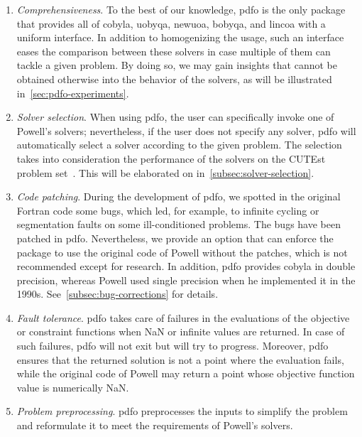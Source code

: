 \begin{enumerate}
    \item \emph{Comprehensiveness}.
    To the best of our knowledge, \gls{pdfo} is the only package that provides all of \gls{cobyla}, \gls{uobyqa}, \gls{newuoa}, \gls{bobyqa}, and \gls{lincoa} with a uniform interface.
    In addition to homogenizing the usage, such an interface eases the comparison between these solvers in case multiple of them can tackle a given problem.
    By doing so, we may gain insights that cannot be obtained otherwise into the behavior of the solvers, as will be illustrated in~\cref{sec:pdfo-experiments}.
    \item \emph{Solver selection}.
    When using \gls{pdfo}, the user can specifically invoke one of Powell's solvers; nevertheless, if the user does not specify any solver, \gls{pdfo} will automatically select a solver according to the given problem.
    The selection takes into consideration the performance of the solvers on the CUTEst problem set~\cite{Gould_Orban_Toint_2015}.
    This will be elaborated on in~\cref{subsec:solver-selection}.
    \item \emph{Code patching}.
    During the development of \gls{pdfo}, we spotted in the original Fortran code some bugs, which led, for example, to infinite cycling or segmentation faults on some ill-conditioned problems.
    The bugs have been patched in \gls{pdfo}.
    Nevertheless, we provide an option that can enforce the package to use the original code of Powell without the patches, which is not recommended except for research.
    In addition, \gls{pdfo} provides \gls{cobyla} in double precision, whereas Powell used single precision when he implemented it in the 1990s.
    See~\cref{subsec:bug-corrections} for details.
    \item \emph{Fault tolerance}.
    \Gls{pdfo} takes care of failures in the evaluations of the objective or constraint functions when NaN or infinite values are returned.
    In case of such failures, \gls{pdfo} will not exit but will try to progress.
    Moreover, \gls{pdfo} ensures that the returned solution is not a point where the evaluation fails, while the original code of Powell may return a point whose objective function value is numerically NaN.
    \item \emph{Problem preprocessing}.
    \gls{pdfo} preprocesses the inputs to simplify the problem and reformulate it to meet the requirements of Powell's solvers.

\end{enumerate}
